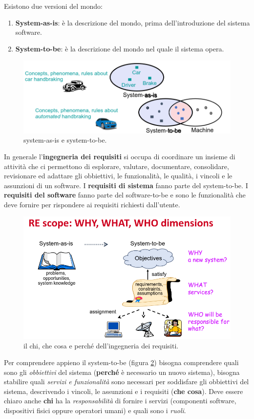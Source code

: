 Esistono due versioni del mondo:
\begin{enumerate}
	\item \textbf{System-as-is}: è la descrizione del mondo, prima dell'introduzione del sistema software.
	\item \textbf{System-to-be}: è la descrizione del mondo nel quale il sistema opera.
\end{enumerate}
\begin{figure}[th]
	\centering
	\includegraphics[width=0.7\linewidth]{img/system-as-is-system-to-be}
	\caption{system-as-is e system-to-be.}
	\label{fig:system-as-is-system-to-be}
\end{figure}
In generale l'\textbf{ingegneria dei requisiti} si occupa di coordinare un insieme di attività che ci permettono di esplorare, valutare, documentare, consolidare, revisionare ed adattare gli obbiettivi, le funzionalità, le qualità, i vincoli e le assunzioni di un software.
I \textbf{requisiti di sistema} fanno parte del system-to-be. I \textbf{requisiti del software} fanno parte del software-to-be e sono le funzionalità che deve fornire per rispondere ai requisiti richiesti dall'utente.
\begin{figure}[th]
	\centering
	\includegraphics[width=0.7\linewidth]{img/www-dimensions}
	\caption{il chi, che cosa e perché dell'ingegneria dei requisiti.}
	\label{fig:www-dimensions}
\end{figure}

Per comprendere appieno il system-to-be (figura \ref{fig:www-dimensions}) bisogna comprendere quali sono gli \emph{obbiettivi} del sistema (\textbf{perché} è necessario un nuovo sistema), bisogna stabilire quali \emph{servizi e funzionalità} sono necessari per soddisfare gli obbiettivi del sistema, descrivendo i vincoli, le assunzioni e i requisiti (\textbf{che cosa}). Deve essere chiaro anche \textbf{chi} ha la \emph{responsabilità} di fornire i servizi (componenti software, dispositivi fisici oppure operatori umani) e quali sono i \emph{ruoli}.

